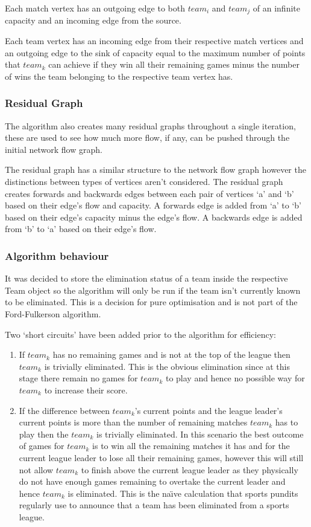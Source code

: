 Each match vertex has an outgoing edge to both $team_i$ and $team_j$ of an
infinite capacity and an incoming edge from the source.

Each team vertex has an incoming edge from their respective match vertices and
an outgoing edge to the sink of capacity equal to the maximum number of points
that $team_k$ can achieve if they win all their remaining games minus the
number of wins the team belonging to the respective team vertex has.

\subsubsection{Residual Graph}

The algorithm also creates many residual graphs throughout a single iteration,
these are used to see how much more flow, if any, can be pushed through the initial
network flow graph.

The residual graph has a similar structure to the network flow graph however
the distinctions between types of vertices aren't considered. The residual
graph creates forwards and backwards edges between each pair of vertices `a'
and `b' based on their edge's flow and capacity. A forwards edge is added from
`a' to `b' based on their edge's capacity minus the edge's flow. A backwards
edge is added from `b' to `a' based on their edge's flow.


\subsubsection{Algorithm behaviour}

It was decided to store the elimination status of a team inside the
respective Team object so the algorithm will only be run if the team isn't
currently known to be eliminated. This is a decision for pure optimisation and
is not part of the Ford-Fulkerson algorithm.

Two `short circuits' have been added prior to the algorithm for efficiency:
\begin{enumerate}
\item If $team_k$ has no remaining games and is not at the top of the league
then $team_k$ is trivially eliminated. This is the obvious elimination since
at this stage there remain no games for $team_k$ to play and hence no possible
way for $team_k$ to increase their score.
\item If the difference between $team_k$'s current points and the league
leader's current points is more than the number of remaining matches $team_k$
has to play then the $team_k$ is trivially eliminated. In this scenario the best
outcome of games for $team_k$ is to win all the remaining matches it has and for
the current league leader to lose all their remaining games, however this will
still not allow $team_k$ to finish above the current league leader as they
physically do not have enough games remaining to overtake the current leader and
hence $team_k$ is eliminated. This is the na\"{\i}ve calculation that sports
pundits regularly use to announce that a team has been eliminated from a sports
league.
\end{enumerate}

